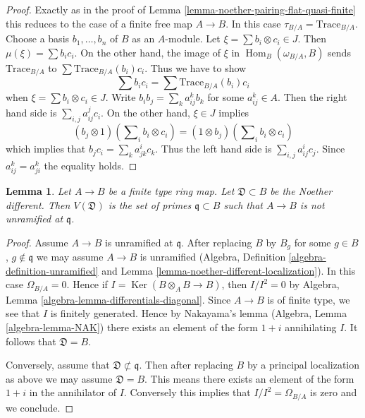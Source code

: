 \documentclass{stacks-project}
\theoremstyle{plain}
\newtheorem{lemma}[subsection]{Lemma}
\theoremstyle{definition}
\theoremstyle{remark}
\numberwithin{equation}{subsection}
\def\Hom{\mathop{\mathrm{Hom}}\nolimits}
\def\Ker{\mathop{\mathrm{Ker}}}
\begin{document}
\begin{proof}
Exactly as in the proof of Lemma \ref{lemma-noether-pairing-flat-quasi-finite}
this reduces to the case of a finite free map $A \to B$.
In this case $\tau_{B/A} = \text{Trace}_{B/A}$.
Choose a basis $b_1, \ldots, b_n$ of $B$ as an $A$-module.
Let $\xi = \sum b_i \otimes c_i \in J$. Then $\mu(\xi) = \sum b_i c_i$.
On the other hand, the image of $\xi$ in $\Hom_B(\omega_{B/A}, B)$
sends $\text{Trace}_{B/A}$ to $\sum \text{Trace}_{B/A}(b_i)c_i$.
Thus we have to show
$$
\sum b_ic_i = \sum \text{Trace}_{B/A}(b_i)c_i
$$
when $\xi = \sum b_i \otimes c_i \in J$. Write $b_i b_j = \sum_k a_{ij}^k b_k$
for some $a_{ij}^k \in A$. Then the right hand side is
$\sum_{i, j} a_{ij}^j c_i$. On the other hand, $\xi \in J$ implies
$$
(b_j \otimes 1)(\sum\nolimits_i b_i \otimes c_i) =
(1 \otimes b_j)(\sum\nolimits_i b_i \otimes c_i)
$$
which implies that $b_j c_i = \sum_k a_{jk}^i c_k$. Thus the left hand side
is $\sum_{i, j} a_{ij}^i c_j$. Since $a_{ij}^k = a_{ji}^k$ the equality holds.
\end{proof}

\begin{lemma}
\label{lemma-noether-different}
Let $A \to B$ be a finite type ring map. Let $\mathfrak{D} \subset B$
be the Noether different. Then $V(\mathfrak{D})$ is the set of primes
$\mathfrak q \subset B$ such that $A \to B$ is not unramified at $\mathfrak q$.
\end{lemma}

\begin{proof}
Assume $A \to B$ is unramified at $\mathfrak q$. After replacing
$B$ by $B_g$ for some $g \in B$, $g \not \in \mathfrak q$ we may
assume $A \to B$ is unramified (Algebra, Definition
\ref{algebra-definition-unramified} and
Lemma \ref{lemma-noether-different-localization}).
In this case $\Omega_{B/A} = 0$. Hence if $I = \Ker(B \otimes_A B \to B)$,
then $I/I^2 = 0$ by
Algebra, Lemma \ref{algebra-lemma-differentials-diagonal}.
Since $A \to B$ is of finite type, we see that $I$ is finitely
generated. Hence by Nakayama's lemma
(Algebra, Lemma \ref{algebra-lemma-NAK})
there exists an element of the form $1 + i$
annihilating $I$. It follows that $\mathfrak{D} = B$.

\medskip\noindent
Conversely, assume that $\mathfrak{D} \not \subset \mathfrak q$.
Then after replacing $B$ by a principal localization as above
we may assume $\mathfrak{D} = B$. This means there exists an
element of the form $1 + i$ in the annihilator of $I$.
Conversely this implies that $I/I^2 = \Omega_{B/A}$ is zero
and we conclude.
\end{proof}
\end{document}
